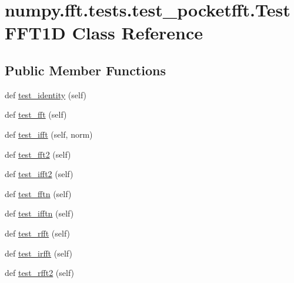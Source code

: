 \hypertarget{classnumpy_1_1fft_1_1tests_1_1test__pocketfft_1_1TestFFT1D}{}\section{numpy.\+fft.\+tests.\+test\+\_\+pocketfft.\+Test\+F\+F\+T1D Class Reference}
\label{classnumpy_1_1fft_1_1tests_1_1test__pocketfft_1_1TestFFT1D}
\subsection*{Public Member Functions}
\begin{DoxyCompactItemize}
\item 
def \hyperlink{classnumpy_1_1fft_1_1tests_1_1test__pocketfft_1_1TestFFT1D_a9ec99715f196f3f1aa8fe4a1b91dc79b}{test\+\_\+identity} (self)
\item 
def \hyperlink{classnumpy_1_1fft_1_1tests_1_1test__pocketfft_1_1TestFFT1D_a2ebd0c597c8f5ab7f86cebf91f06cbec}{test\+\_\+fft} (self)
\item 
def \hyperlink{classnumpy_1_1fft_1_1tests_1_1test__pocketfft_1_1TestFFT1D_a1f13d889e76f4c9c31ff03b84a12bc20}{test\+\_\+ifft} (self, norm)
\item 
def \hyperlink{classnumpy_1_1fft_1_1tests_1_1test__pocketfft_1_1TestFFT1D_a6075b740618a1715c15430979a00ba49}{test\+\_\+fft2} (self)
\item 
def \hyperlink{classnumpy_1_1fft_1_1tests_1_1test__pocketfft_1_1TestFFT1D_a70b24f8ae7c0912298d494db0deff7d6}{test\+\_\+ifft2} (self)
\item 
def \hyperlink{classnumpy_1_1fft_1_1tests_1_1test__pocketfft_1_1TestFFT1D_ad72f96279e40942280fc0a071c5dc5d7}{test\+\_\+fftn} (self)
\item 
def \hyperlink{classnumpy_1_1fft_1_1tests_1_1test__pocketfft_1_1TestFFT1D_a1a587f97198dc86ddcf1cd916fad4491}{test\+\_\+ifftn} (self)
\item 
def \hyperlink{classnumpy_1_1fft_1_1tests_1_1test__pocketfft_1_1TestFFT1D_ae5a2d8ab3731c4c202255796fe80d8d7}{test\+\_\+rfft} (self)
\item 
def \hyperlink{classnumpy_1_1fft_1_1tests_1_1test__pocketfft_1_1TestFFT1D_ae827c35870425558ab4006eba1158b53}{test\+\_\+irfft} (self)
\item 
def \hyperlink{classnumpy_1_1fft_1_1tests_1_1test__pocketfft_1_1TestFFT1D_a9bed071db4805c389631356a1e6234c9}{test\+\_\+rfft2} (self)
\item 

\end{DoxyCompactItemize}
